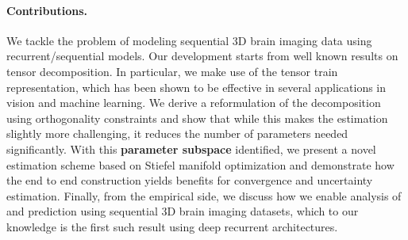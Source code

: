 \paragraph{Contributions.}
We tackle the problem of modeling 
sequential 3D brain imaging data using 
recurrent/sequential models. 
Our development starts from well known results on tensor decomposition. In particular, we 
make use of the tensor train representation, which has been shown to be effective in several 
applications in vision and machine learning. We derive a reformulation of the decomposition using 
orthogonality constraints and show that while this makes the estimation slightly more challenging, 
it reduces the number of parameters needed significantly. 
With this \textbf{parameter subspace} identified,
 we present a novel estimation scheme based on Stiefel manifold optimization and demonstrate 
how the end to end construction yields benefits for convergence and uncertainty estimation. 
Finally, from the empirical side, we discuss how we enable analysis of and prediction using sequential 3D brain imaging datasets, which to our knowledge is the first such result using 
deep recurrent architectures. 
